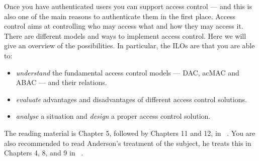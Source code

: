 Once you have authenticated users you can support access control --- and this 
is also one of the main reasons to authenticate them in the first place.
Access control aims at controlling who may access what and how they may access 
it.
There are different models and ways to implement access control.
Here we will give an overview of the possibilities.
In particular, the \acp{ILO} are that you are able to:
\begin{itemize}
  \item \emph{understand} the fundamental access control models --- \ac{DAC}, 
    \ac{acMAC} and \ac{ABAC} --- and their relations.
  \item \emph{evaluate} advantages and disadvantages of different access 
    control solutions.
  \item \emph{analyse} a situation and \emph{design} a proper access control 
    solution.
\end{itemize}

The reading material is Chapter 5, followed by Chapters 11 and 12, in 
~\cite{Gollmann2011cs}.
You are also recommended to read Anderson's treatment of the subject, he treats 
this in Chapters 4, 8, and 9 in 
~\cite{Anderson2008sea}.
